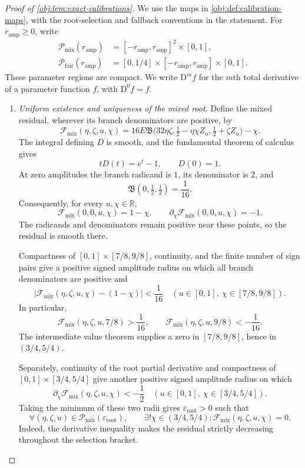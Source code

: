 \begin{proof}[Proof of \cref{obj:lem:exact-calibrations}]
We use the maps in \cref{obj:def:calibration-maps}, with the root-selection and fallback conventions in the statement. For \(r_{\mathrm{amp}}\ge0\), write
\[
\begin{aligned}
\mathcal P_{\mathrm{mix}}(r_{\mathrm{amp}})
&=[-r_{\mathrm{amp}},r_{\mathrm{amp}}]^2\times[0,1],\\
\mathcal P_{\mathrm{fair}}(r_{\mathrm{amp}})
&=[0,1/4]\times[-r_{\mathrm{amp}},r_{\mathrm{amp}}]\times[0,1].
\end{aligned}
\]
These parameter regions are compact. We write \(\mathrm D^m f\) for the \(m\)th total derivative of a parameter function \(f\), with \(\mathrm D^0f=f\).

\begin{enumerate}
\item \emph{Uniform existence and uniqueness of the mixed root.}
Define the mixed residual, wherever its branch denominators are positive, by
\[
\mathcal F_{\mathrm{mix}}(\eta,\zeta,u,\chi)
=
16E\mathfrak B
\bigl(32\eta\zeta,\tfrac12-\eta\chi Z_u,
                    \tfrac12+\zeta Z_u\bigr)-\chi .
\]
The integral defining \(D\) is smooth, and the fundamental theorem of calculus gives
\[
tD(t)=e^t-1,\qquad D(0)=1.
\]
At zero amplitudes the branch radicand is \(1\), its denominator is \(2\), and
\[
\mathfrak B(0,\tfrac12,\tfrac12)=\frac1{16}.
\]
Consequently, for every \(u,\chi\in\mathbb R\),
\[
\mathcal F_{\mathrm{mix}}(0,0,u,\chi)=1-\chi,
\qquad
\partial_\chi\mathcal F_{\mathrm{mix}}(0,0,u,\chi)=-1.
\]
The radicands and denominators remain positive near these points, so the residual is smooth there.

Compactness of \([0,1]\times[7/8,9/8]\), continuity, and the finite number of sign pairs give a positive signed amplitude radius on which all branch denominators are positive and
\[
\left|
\mathcal F_{\mathrm{mix}}(\eta,\zeta,u,\chi)-(1-\chi)
\right|<\frac1{16}
\quad
\left(u\in[0,1],\ \chi\in[7/8,9/8]\right).
\]
In particular,
\[
\mathcal F_{\mathrm{mix}}(\eta,\zeta,u,7/8)>\frac1{16},
\qquad
\mathcal F_{\mathrm{mix}}(\eta,\zeta,u,9/8)<-\frac1{16}.
\]
The intermediate value theorem supplies a zero in \([7/8,9/8]\), hence in \((3/4,5/4)\).

Separately, continuity of the root partial derivative and compactness of
\([0,1]\times[3/4,5/4]\) give another positive signed amplitude radius on which
\[
\partial_\chi\mathcal F_{\mathrm{mix}}(\eta,\zeta,u,\chi)<-\frac12
\quad
\left(u\in[0,1],\ \chi\in[3/4,5/4]\right).
\]
Taking the minimum of these two radii gives
\(\varepsilon_{\mathrm{root}}>0\) such that
\[
\forall(\eta,\zeta,u)\in
\mathcal P_{\mathrm{mix}}(\varepsilon_{\mathrm{root}}),
\qquad
\exists!\chi\in(3/4,5/4):
\mathcal F_{\mathrm{mix}}(\eta,\zeta,u,\chi)=0.
\]
Indeed, the derivative inequality makes the residual strictly decreasing throughout the selection bracket.


\end{enumerate}
\end{proof}
